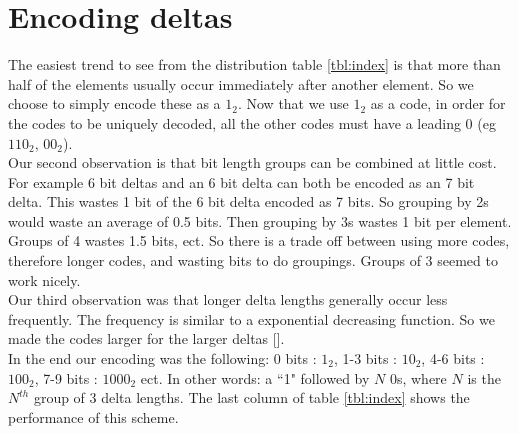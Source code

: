 \section{Encoding deltas}
The easiest trend to see from the distribution table \ref{tbl:index} is that more than half of the elements usually occur immediately after another element. So we choose to simply encode these as a $1_2$. Now that we use $1_2$ as a code, in order for the codes to be uniquely decoded, all the other codes must have a leading 0 (eg $110_2$, $00_2$). \\
\indent  Our second observation is that bit length groups can be combined at little cost. For example 6 bit deltas and an 6 bit delta can both be encoded as an 7 bit delta. This wastes 1 bit of the 6 bit delta encoded as 7 bits. So grouping by 2s would waste an average of 0.5 bits. Then grouping by 3s wastes 1 bit per element. Groups of 4 wastes 1.5 bits, ect. So there is a trade off between using more codes, therefore longer codes, and wasting bits to do groupings. Groups of 3 seemed to work nicely.\\
\indent Our third observation was that longer delta lengths generally occur less frequently. The frequency is similar to a exponential decreasing function. So we made the codes larger for the larger deltas [\cite{prelim:salomon}].\\
\indent In the end our encoding was the following: 0 bits : $1_2$, 1-3 bits : $10_2$, 4-6 bits : $100_2$, 7-9 bits : $1000_2$ ect. In other words: a ``1" followed by $N$ 0s, where $N$ is the $N^{th}$ group of 3 delta lengths. The last column of table \ref{tbl:index} shows the performance of this scheme.

